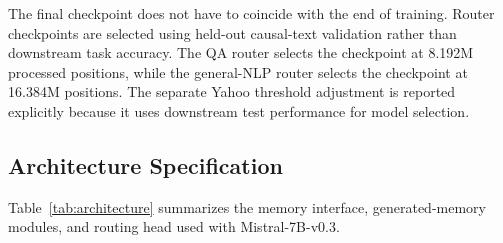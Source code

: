 The final checkpoint does not have to coincide with the end of training.
Router checkpoints are selected using held-out causal-text validation rather
than downstream task accuracy. The QA router selects the checkpoint at
8.192M processed positions, while the general-NLP router selects the checkpoint
at 16.384M positions. The separate Yahoo threshold adjustment is reported
explicitly because it uses downstream test performance for model selection.


\subsection{Architecture Specification}

Table~\ref{tab:architecture} summarizes the memory interface, generated-memory
modules, and routing head used with Mistral-7B-v0.3.

